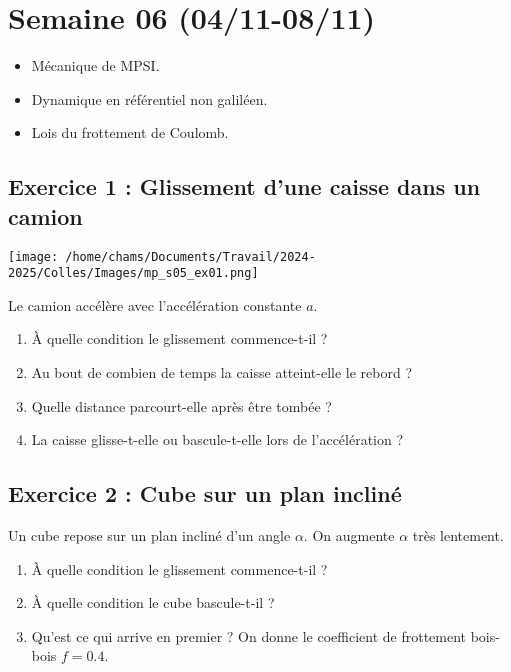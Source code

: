 \section{Semaine 06 (04/11-08/11) }


\begin{itemize}
	\item Mécanique de MPSI.
	\item Dynamique en référentiel non galiléen.
	\item Lois du frottement de Coulomb.
\end{itemize}

\subsection{Exercice 1 : Glissement d'une caisse dans un camion}

\begin{minipage}[c]{\linewidth/2}
	\texttt{[image: /home/chams/Documents/Travail/2024-2025/Colles/Images/mp\_s05\_ex01.png]}
\end{minipage}%
\begin{minipage}[c]{\linewidth/2}
	Le camion accélère avec l'accélération constante $a$.
	\begin{enumerate}
		\item À quelle condition le glissement commence-t-il ?
		\item Au bout de combien de temps la caisse atteint-elle le rebord ?
		\item Quelle distance parcourt-elle après être tombée ?
		\item La caisse glisse-t-elle ou bascule-t-elle lors de l'accélération ?
	\end{enumerate}
\end{minipage}

\subsection{Exercice 2 : Cube sur un plan incliné}

Un cube repose sur un plan incliné d'un angle $\alpha$. On augmente $\alpha$ très lentement.

\begin{enumerate}
	\item À quelle condition le glissement commence-t-il ?
	\item À quelle condition le cube bascule-t-il ?
	\item Qu'est ce qui arrive en premier ? On donne le coefficient de frottement bois-bois $f = 0.4$.
\end{enumerate}

